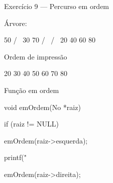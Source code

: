 Exercício 9 — Percurso em ordem

Árvore:

        50
       /  \
     30    70
    / \    / \
  20  40  60  80

  Ordem de impressão

20 30 40 50 60 70 80

Função em ordem

void emOrdem(No *raiz) {

    if (raiz != NULL) {

        emOrdem(raiz->esquerda);

        printf("%

        emOrdem(raiz->direita);
    }
}